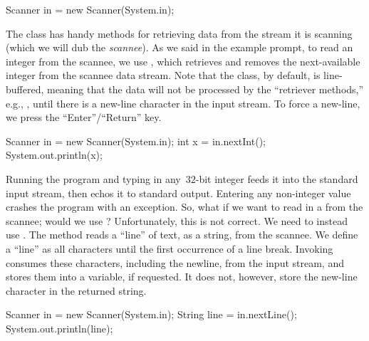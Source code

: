 \begin{verbnobox}[\small]
Scanner in = new Scanner(System.in);
\end{verbnobox}

The  class has handy methods for retrieving data from the stream it is scanning (which we will dub the \emph{scannee}). 
As we said in the example prompt, to read an integer from the scannee, we use , which retrieves and removes the next-available integer from the scannee data stream. 
Note that the  class, by default, is line-buffered, meaning that the data will not be processed by the ``retriever methods,'' e.g., , until there is a new-line character in the input stream. To force a new-line, we press the ``Enter''/``Return'' key.

\begin{verbnobox}[\small]
Scanner in = new Scanner(System.in);
int x = in.nextInt();
System.out.println(x);
\end{verbnobox}

Running the program and typing in any~$32$-bit integer feeds it into the standard input stream, then echos it to standard output. 
Entering any non-integer value crashes the program with an  exception. 
So, what if we want to read in a  from the scannee; would we use ? 
Unfortunately, this is not correct. 
We need to instead use .
The  method reads a ``line'' of text, as a string, from the scannee. 
We define a ``line'' as all characters until the first occurrence of a line break. 
Invoking  consumes these characters, including the newline, from the input stream, and stores them into a variable, if requested. 
It does not, however, store the new-line character in the returned string. 

\begin{verbnobox}[\small]
Scanner in = new Scanner(System.in);
String line = in.nextLine();
System.out.println(line);
\end{verbnobox}

